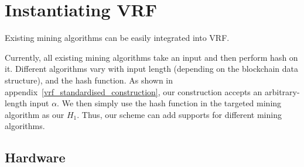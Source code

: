 \section{Instantiating VRF}





Existing mining algorithms can be easily integrated into VRF.

Currently, all existing mining algorithms take an input and then perform hash on it. Different algorithms vary with input length (depending on the blockchain data structure), and the hash function.
As shown in appendix~\ref{vrf_standardised_construction}, our construction accepts an arbitrary-length input $\alpha$.
We then simply use the hash function in the targeted mining algorithm as our $H_{1}$.
Thus, our scheme can add supports for different mining algorithms.




\subsection{Hardware }